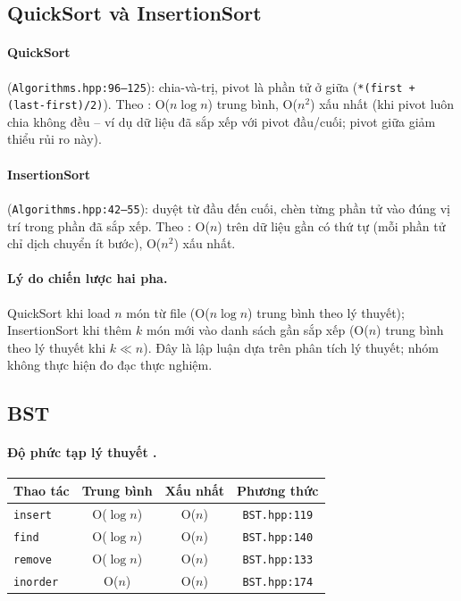 \documentclass[12pt, a4paper]{article}
\begin{document}
\subsection{QuickSort và InsertionSort}

\paragraph{QuickSort} (\texttt{Algorithms.hpp:96--125}): chia-và-trị, pivot là phần tử ở giữa
(\texttt{*(first + (last-first)/2)}). Theo \cite{clrs}: O($n \log n$) trung bình, O($n^2$) xấu nhất
(khi pivot luôn chia không đều -- ví dụ dữ liệu đã sắp xếp với pivot đầu/cuối; pivot giữa giảm
thiểu rủi ro này).

\paragraph{InsertionSort} (\texttt{Algorithms.hpp:42--55}): duyệt từ đầu đến cuối, chèn từng
phần tử vào đúng vị trí trong phần đã sắp xếp. Theo \cite{clrs}: O($n$) trên dữ liệu gần có thứ tự
(mỗi phần tử chỉ dịch chuyển ít bước), O($n^2$) xấu nhất.

\paragraph{Lý do chiến lược hai pha.}
QuickSort khi load $n$ món từ file (O($n \log n$) trung bình theo lý thuyết); InsertionSort khi
thêm $k$ món mới vào danh sách gần sắp xếp (O($n$) trung bình theo lý thuyết khi $k \ll n$).
Đây là lập luận dựa trên phân tích lý thuyết; nhóm không thực hiện đo đạc thực nghiệm.

\subsection{BST}

\paragraph{Độ phức tạp lý thuyết \cite{clrs}.}
\begin{table}[H]
\centering
\begin{tabular}{lccc}
\toprule
\textbf{Thao tác} & \textbf{Trung bình} & \textbf{Xấu nhất} & \textbf{Phương thức} \\
\midrule
\texttt{insert} & O($\log n$) & O($n$) & \texttt{BST.hpp:119} \\
\texttt{find}   & O($\log n$) & O($n$) & \texttt{BST.hpp:140} \\
\texttt{remove} & O($\log n$) & O($n$) & \texttt{BST.hpp:133} \\
\texttt{inorder} & O($n$) & O($n$) & \texttt{BST.hpp:174} \\
\bottomrule
\end{tabular}
\end{table}
\end{document}
